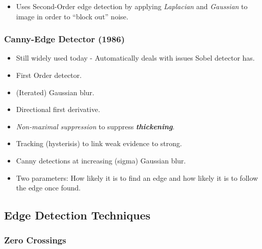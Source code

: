 \documentclass[english, 10pt]{article}
\begin{document}
\begin{itemize}
\itemsep1pt\parskip0pt
\item
  Uses Second-Order edge detection by applying \emph{Laplacian} and
  \emph{Gaussian} to image in order to ``block out'' noise.
\end{itemize}

\subsubsection{Canny-Edge Detector
(1986)}\label{canny-edge-detector-1986}

\begin{itemize}
\itemsep1pt\parskip0pt
\item
  Still widely used today - Automatically deals with issues Sobel
  detector has.
\item
  First Order detector.
\item
  (Iterated) Gaussian blur.
\item
  Directional first derivative.
\item
  \emph{Non-maximal suppression} to suppress \textbf{\emph{thickening}}.
\item
  Tracking (hysterisis) to link weak evidence to strong.
\item
  Canny detections at increasing (sigma) Gaussian blur.
  \item Two parameters: How likely it is to find an edge and how likely it is to follow the edge once found. 
\end{itemize}

\subsection{Edge Detection Techniques}\label{edge-detection-techniques}

\subsubsection{Zero Crossings}\label{zero-crossings}
\end{document}
